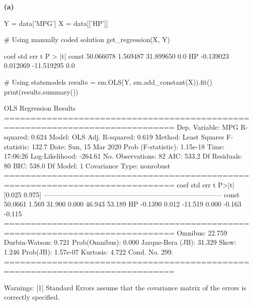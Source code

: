 \textbf{(a)}

\begin{python}
Y = data['MPG']
X = data[['HP']]
\end{python}

\begin{python}
# Using manually coded solution
get_regression(X, Y)
\end{python}

\begin{console}
	coef	std err	t	P > |t|
const	50.066078	1.569487	31.899650	0.0
HP	-0.139023	0.012069	-11.519295	0.0
\end{console}

\begin{python}
# Using statsmodels
results = sm.OLS(Y, sm.add_constant(X)).fit()
print(results.summary())
\end{python}

\begin{console}
                            OLS Regression Results
==============================================================================
Dep. Variable:                    MPG   R-squared:                       0.624
Model:                            OLS   Adj. R-squared:                  0.619
Method:                 Least Squares   F-statistic:                     132.7
Date:                Sun, 15 Mar 2020   Prob (F-statistic):           1.15e-18
Time:                        17:06:26   Log-Likelihood:                -264.61
No. Observations:                  82   AIC:                             533.2
Df Residuals:                      80   BIC:                             538.0
Df Model:                           1
Covariance Type:            nonrobust
==============================================================================
                 coef    std err          t      P>|t|      [0.025      0.975]
------------------------------------------------------------------------------
const         50.0661      1.569     31.900      0.000      46.943      53.189
HP            -0.1390      0.012    -11.519      0.000      -0.163      -0.115
==============================================================================
Omnibus:                       22.759   Durbin-Watson:                   0.721
Prob(Omnibus):                  0.000   Jarque-Bera (JB):               31.329
Skew:                           1.246   Prob(JB):                     1.57e-07
Kurtosis:                       4.722   Cond. No.                         299.
==============================================================================

Warnings:
[1] Standard Errors assume that the covariance matrix of the errors is correctly
specified.
\end{console}

